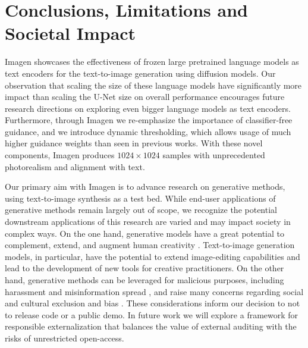 \section{Conclusions, Limitations and Societal Impact}
\label{sec:limitations}

Imagen showcases the effectiveness of frozen large pretrained language models as text encoders for the text-to-image generation using diffusion models. Our observation that scaling the size of these language models have significantly more impact than scaling the U-Net size on overall performance encourages future research directions on exploring even bigger language models as text encoders. Furthermore, through Imagen we re-emphasize the importance of classifier-free guidance, and we introduce dynamic thresholding, which allows usage of much higher guidance weights than seen in previous works. With these novel components, Imagen produces $1024\times1024$ samples with unprecedented photorealism and alignment with text.

Our primary aim with Imagen is to advance research on generative methods, using text-to-image synthesis as a test bed. While end-user applications of generative methods remain largely out of scope, we recognize the potential downstream applications of this research are varied and may impact society in complex ways. On the one hand, generative models have a great potential to complement, extend, and augment human creativity \cite{hughes2021}. Text-to-image generation models, in particular, have the potential to extend image-editing capabilities  and lead to the development of new tools for creative practitioners. On the other hand, generative methods can be leveraged for malicious purposes, including harassment and misinformation spread \cite{franks2019}, and raise many concerns regarding social and cultural exclusion and bias \cite{Srinivasan2021, Sequeira2021, Steed2021}. These considerations inform our decision to not to release code or a public demo. In future work we will explore a framework for responsible externalization that balances the value of external auditing with the risks of unrestricted open-access.

